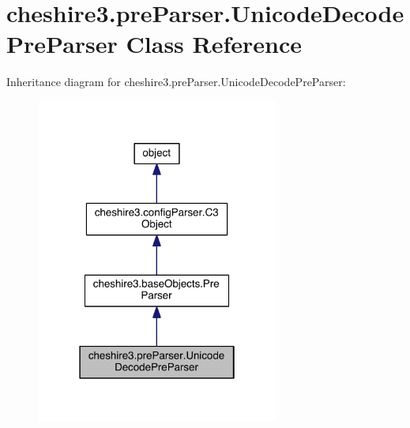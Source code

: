 \hypertarget{classcheshire3_1_1pre_parser_1_1_unicode_decode_pre_parser}{\section{cheshire3.\-pre\-Parser.\-Unicode\-Decode\-Pre\-Parser Class Reference}
\label{classcheshire3_1_1pre_parser_1_1_unicode_decode_pre_parser}
}


Inheritance diagram for cheshire3.\-pre\-Parser.\-Unicode\-Decode\-Pre\-Parser\-:
\nopagebreak
\begin{figure}[H]
\begin{center}
\leavevmode
\includegraphics[width=226pt]{classcheshire3_1_1pre_parser_1_1_unicode_decode_pre_parser__inherit__graph}
\end{center}
\end{figure}


